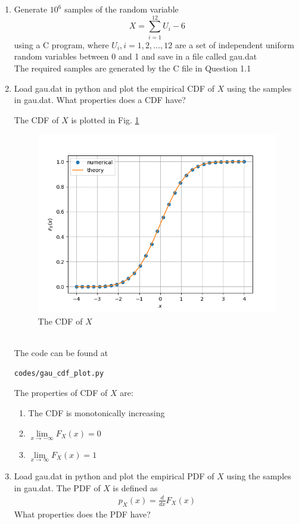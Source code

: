 \documentclass[journal,12pt,twocolumn]{IEEEtran}
\renewcommand\thesection{\arabic{section}}
\begin{document}
\begin{enumerate}[label=\thesection.\arabic*
,ref=\thesection.\theenumi]

%
\item
Generate $10^6$ samples of the random variable
%
\begin{equation}
X = \sum_{i=1}^{12}U_i -6
\end{equation}
%
using a C program, where $U_i, i = 1,2,\dots, 12$ are  a set of independent uniform random variables between 0 and 1
and save in a file called gau.dat\\

\solution
The required samples are  generated by the C file in Question 1.1\\
%
\item
Load gau.dat in python and plot the empirical CDF of $X$ using the samples in gau.dat. What properties does a CDF have?

\solution The CDF of $X$ is plotted in Fig. \ref{fig:gau_cdf}
\begin{figure}[h!]
\centering
\includegraphics[width=\columnwidth]{./figs/gau_cdf.png}
\caption{The CDF of $X$}
\label{fig:gau_cdf}
\end{figure}\\

The code can be found at
\begin{lstlisting}
codes/gau_cdf_plot.py
\end{lstlisting}
The properties of CDF of $X$ are:
		\begin{enumerate}
			\item The CDF is monotonically increasing
			\item $\lim\limits_{x \to -\infty}F_X(x) = 0$
			\item $\lim\limits_{x \to \infty}F_X(x) = 1$\\
		\end{enumerate}
\item
Load gau.dat in python and plot the empirical PDF of $X$ using the samples in gau.dat. The PDF of $X$ is defined as
\begin{align}
p_{X}(x) = \frac{d}{dx}F_{X}(x)
\end{align}
What properties does the PDF have?


\end{enumerate}
\end{document}
